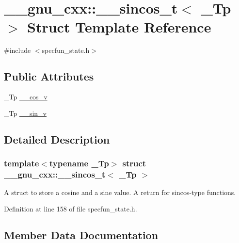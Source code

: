 \hypertarget{struct____gnu__cxx_1_1____sincos__t}{}\section{\+\_\+\+\_\+gnu\+\_\+cxx\+:\+:\+\_\+\+\_\+sincos\+\_\+t$<$ \+\_\+\+Tp $>$ Struct Template Reference}
\label{struct____gnu__cxx_1_1____sincos__t}


{\ttfamily \#include $<$specfun\+\_\+state.\+h$>$}

\subsection*{Public Attributes}
\begin{DoxyCompactItemize}
\item 
\+\_\+\+Tp \hyperlink{struct____gnu__cxx_1_1____sincos__t_ae88c123c9c9b2d138fdaa43b0c1addb6}{\+\_\+\+\_\+cos\+\_\+v}
\item 
\+\_\+\+Tp \hyperlink{struct____gnu__cxx_1_1____sincos__t_a22a21d9a5658097549cbca39b891fd27}{\+\_\+\+\_\+sin\+\_\+v}
\end{DoxyCompactItemize}


\subsection{Detailed Description}
\subsubsection*{template$<$typename \+\_\+\+Tp$>$\newline
struct \+\_\+\+\_\+gnu\+\_\+cxx\+::\+\_\+\+\_\+sincos\+\_\+t$<$ \+\_\+\+Tp $>$}

A struct to store a cosine and a sine value. A return for sincos-\/type functions. 

Definition at line 158 of file specfun\+\_\+state.\+h.



\subsection{Member Data Documentation}
\mbox{\label{struct____gnu__cxx_1_1____sincos__t_ae88c123c9c9b2d138fdaa43b0c1addb6}} 
